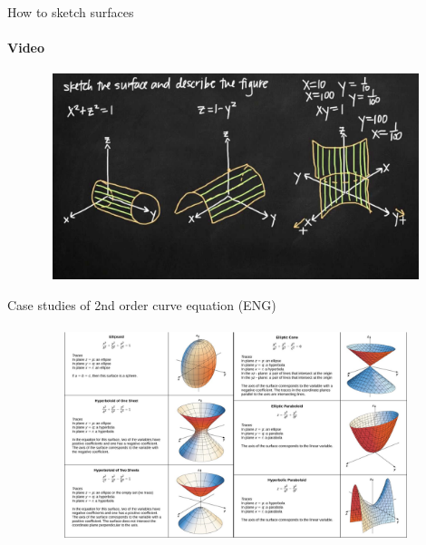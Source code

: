 \documentclass[aspectratio=169]{beamer}
\begin{document}
\begin{frame}[t]{How to sketch surfaces}
    \framesubtitle{Video}
    \vspace{-0.6cm}
    \begin{figure}[H]
        \href{https://youtu.be/UWbEd-9yfD0}{
            \centering\includegraphics[height=6cm,width=1\textwidth,keepaspectratio]{sketch.jpg}}
        \label{fig:sketch.jpg}
    \end{figure}
\end{frame}

\begin{frame}[t]{Case studies of 2nd order curve equation (ENG)}
\framesubtitle{}
    \vspace{-0.6cm}
    \begin{figure}[H]
        \centering\includegraphics[height=6cm,width=1\textwidth,keepaspectratio]{curve_eq_eng.png}
        \label{fig:curve_eq_eng.png}
    \end{figure}
\end{frame}
\end{document}
